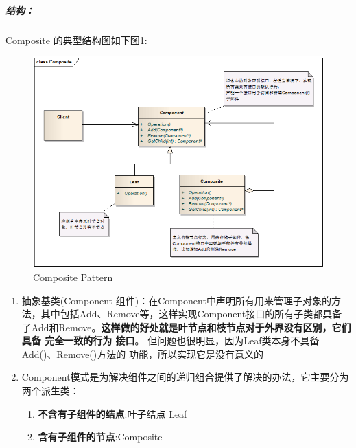 \documentclass[UTF8,a4paper,12pt]{ctexbook}
\begin{document}
		\subparagraph{结构：}Composite 的典型结构图如下图\ref{Composite}:
		\begin{figure}[h]
			\centering
			\includegraphics[scale= 0.8]{Composite.png}
			\caption{Composite Pattern}
			\label{Composite}
		\end{figure}
		
		\begin{enumerate}[itemindent = 1em]
			\item 抽象基类(Component-组件)：在Component中声明所有用来管理子对象的方法，其中包括Add、Remove等，这样实现Component接口的所有子类都具备了Add和Remove。\textbf{这样做的好处就是叶节点和枝节点对于外界没有区别，它们具备 完全一致的行为 接口}。
			但问题也很明显，因为Leaf类本身不具备Add()、Remove()方法的 功能，所以实现它是没有意义的
			
			\item Component模式是为解决组件之间的递归组合提供了解决的办法，它主要分为两个派生类：
				\begin{enumerate}
					\item \textbf{不含有子组件的结点}:叶子结点 Leaf
					\item \textbf{含有子组件的节点}:Composite
				\end{enumerate}
		\end{enumerate}
\end{document}
